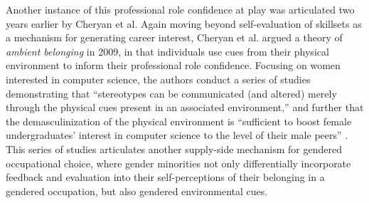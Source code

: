 Another instance of this professional role confidence at play was articulated two years earlier by Cheryan et al. Again moving beyond self-evaluation of skillsets as a mechanism for generating career interest, Cheryan et al. argued a theory of \textit{ambient belonging} in 2009, in that individuals use cues from their physical environment to inform their professional role confidence. Focusing on women interested in computer science, the authors conduct a series of studies demonstrating that ``stereotypes can be communicated (and altered) merely through the physical cues present in an associated environment,'' and further that the demasculinization of the physical environment is ``sufficient to boost female undergraduates’ interest in computer science to the level of their male peers'' \cite{cheryan_2009}. This series of studies articulates another supply-side mechanism for gendered occupational choice, where gender minorities not only differentially incorporate feedback and evaluation into their self-perceptions of their belonging in a gendered occupation, but also gendered environmental cues.

